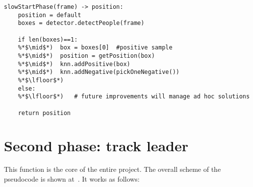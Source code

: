 \begin{lstlisting}[captionpos=b, 
	caption={It is the pseudocode of the first phase. The function \textit{slow start} computes only detections in order to train the KNN people classifier.}, 
	label=alg:slowStartPhase
	]
slowStartPhase(frame) -> position:
	position = default
	boxes = detector.detectPeople(frame)
	
	if len(boxes)==1:
	%*$\mid$*)	box = boxes[0]	#positive sample
	%*$\mid$*)	position = getPosition(box)
	%*$\mid$*)	knn.addPositive(box)
	%*$\mid$*)	knn.addNegative(pickOneNegative())
	%*$\lfloor$*)
	else:
	%*$\lfloor$*)	# future improvements will manage ad hoc solutions

	return position
\end{lstlisting}


\section{Second phase: track leader} \label{sec:trackLeaderPhase}
This function is the core of the entire project. The overall scheme of the pseudocode is shown at~. It works as follows:\\
